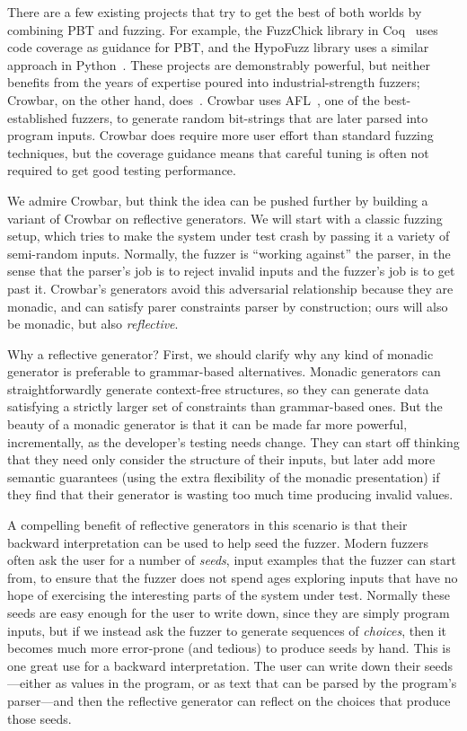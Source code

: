 There are a few existing projects that try to get the best of both worlds by
combining PBT and fuzzing.
For example, the FuzzChick library in Coq~\cite{OLDlampropoulos19fuzzchick}
uses code coverage as guidance for PBT, and the HypoFuzz library uses a
similar approach in Python~\cite{hatfield-dodds_hypofuzz_nodate}. These projects
are demonstrably powerful, but neither benefits from the years of expertise
poured into industrial-strength fuzzers; Crowbar, on the other hand,
does~\cite{dolan2017testing}. Crowbar uses
AFL~\cite{afl-readme}, one of the best-established
fuzzers, to generate random bit-strings that are later parsed into program
inputs. Crowbar does require more user effort than standard fuzzing techniques,
but the coverage guidance means that careful tuning is often not required to get
good testing performance.

We admire Crowbar, but think the idea can be pushed further by building
a variant of Crowbar on reflective generators.
We will start with a classic fuzzing setup, which tries to make the
system under test
crash by passing it a variety of semi-random inputs. Normally, the fuzzer is
``working against'' the parser, in the sense that the parser's job is to reject
invalid inputs and the fuzzer's job is to get past it.  Crowbar's
generators avoid this adversarial relationship because they are
monadic, and can satisfy parer constraints
parser by construction; ours will also be monadic, but also {\em reflective}.

Why a reflective generator? First, we should clarify why any kind of monadic
generator is preferable to grammar-based alternatives. Monadic generators can
straightforwardly generate context-free structures, so they can generate data
satisfying a strictly larger set of constraints than grammar-based ones.
But the beauty of a monadic
generator is that it can be made far more powerful, incrementally, as the
developer's testing needs change. They can start off thinking that they
need only consider the structure of their inputs, but later add more
semantic guarantees (using the extra flexibility of the monadic
presentation) if they find that their generator is wasting too much time
producing invalid values.

A compelling benefit of reflective generators in this scenario is that
their backward interpretation can be used to help seed the fuzzer.
Modern fuzzers often
ask the user for a number of {\em seeds}, input examples that the fuzzer can start from,
to ensure that the fuzzer does not spend ages exploring
inputs that have no hope of exercising the interesting parts of the
system under test. Normally these seeds are easy enough
for the user to write down, since they are simply program inputs, but if
we instead ask the fuzzer to generate sequences of {\em choices}, then
it becomes much more
error-prone (and tedious) to produce seeds by hand.  This is one great use for a
backward interpretation. The user can write down their seeds---either as values
in the program, or as text that can be parsed by the program's parser---and then
the reflective generator can reflect on the choices that produce those seeds.

